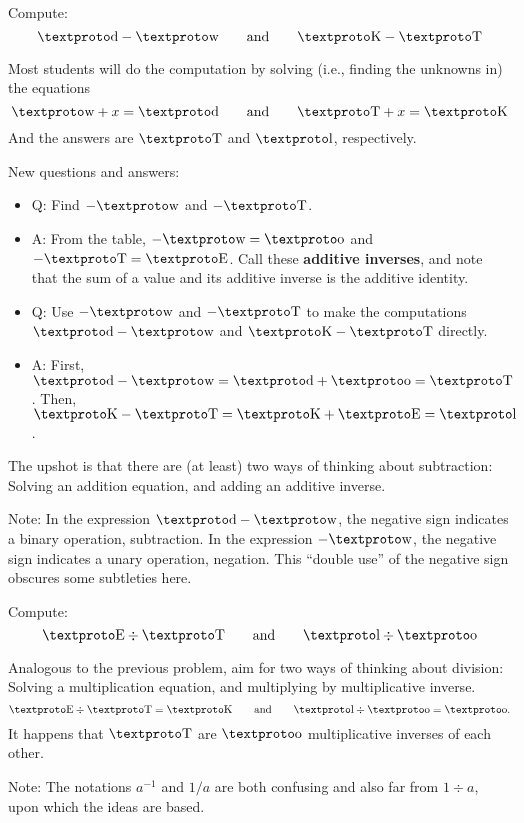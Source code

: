 \documentclass[nooutcomes]{ximera}
\begin{document}
\begin{problem} Compute:
\[
\loo - \la \qquad\text{and}\qquad \ld - \lc
\]
\begin{teachingnote}
Most students will do the computation by solving (i.e., finding the unknowns in) the equations  
\[
\la + x = \loo  \qquad\text{and}\qquad \lc + x = \ld
\]
And the answers are $\lc$ and $\lh$, respectively.  

New questions and answers:  
\begin{itemize}
\item Q: Find $-\la$ and $-\lc$.  
\item A: From the table, $-\la=\li$ and $-\lc=\lf$.  Call these \textbf{additive inverses}, and note that the sum of a value and its additive inverse is the additive identity.  
\item Q: Use $-\la$ and $-\lc$ to make the computations $\loo - \la$ and $\ld - \lc$ directly. 
\item A: First, $\loo - \la = \loo + \li =\lc$.  Then, $\ld - \lc = \ld + \lf = \lh$.  
\end {itemize}

The upshot is that there are (at least) two ways of thinking about subtraction:  Solving an addition equation, and adding an additive inverse.  

Note: In the expression $\loo - \la$, the negative sign indicates a binary operation, subtraction.  In the expression $-\la$, the negative sign indicates a unary operation, negation.  This ``double use'' of the negative sign obscures some subtleties here.  
\end{teachingnote}
\end{problem}

\begin{problem} Compute:
\[
\lf \div \lc \qquad\text{and}\qquad \lh \div \li
\]
\begin{teachingnote}
Analogous to the previous problem, aim for two ways of thinking about division:  Solving a multiplication equation, and multiplying by multiplicative inverse. 
\[
\lf \div \lc = \ld \qquad\text{and}\qquad \lh \div \li = \li. \\
\]
It happens that $\lc$ are $\li$ multiplicative inverses of each other.  

Note:  The notations $a^{-1}$ and $1/a$ are both confusing and also far from $1\div a$, upon which the ideas are based.  
\end{teachingnote}
\end{problem}
\end{document}
